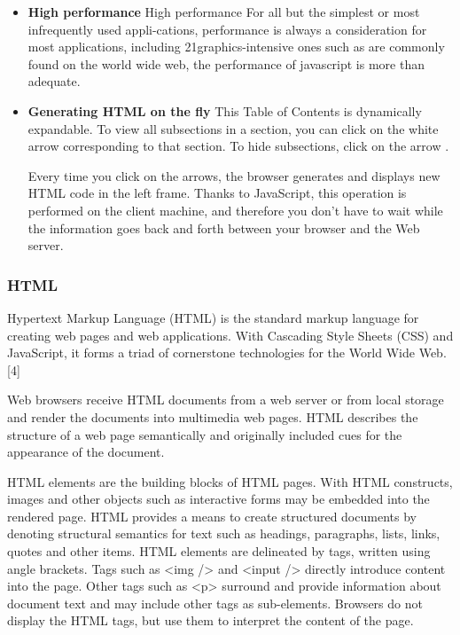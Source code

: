 \begin{itemize}
\item \textbf{High performance}
High performance For all but the simplest or most infrequently used appli-cations,
performance is always a consideration for most applications, including
21graphics-intensive ones such as are commonly found on the world wide web,
the performance of javascript is more than adequate.

\item \textbf{ Generating HTML on the fly}
This Table of Contents is dynamically expandable. To view all subsections in a section, you can click on the white arrow  corresponding to that section. To hide subsections, click on the arrow .

Every time you click on the arrows, the browser generates and displays new HTML code in the left frame. Thanks to JavaScript, this operation is performed on the client machine, and therefore you don't have to wait while the information goes back and forth between your browser and the Web server.




\end{itemize}

\subsubsection{HTML}
Hypertext Markup Language (HTML) is the standard markup language for creating web pages and web applications. With Cascading Style Sheets (CSS) and JavaScript, it forms a triad of cornerstone technologies for the World Wide Web.[4]

Web browsers receive HTML documents from a web server or from local storage and render the documents into multimedia web pages. HTML describes the structure of a web page semantically and originally included cues for the appearance of the document.

HTML elements are the building blocks of HTML pages. With HTML constructs, images and other objects such as interactive forms may be embedded into the rendered page. HTML provides a means to create structured documents by denoting structural semantics for text such as headings, paragraphs, lists, links, quotes and other items. HTML elements are delineated by tags, written using angle brackets. Tags such as <img /> and <input /> directly introduce content into the page. Other tags such as <p> surround and provide information about document text and may include other tags as sub-elements. Browsers do not display the HTML tags, but use them to interpret the content of the page.

